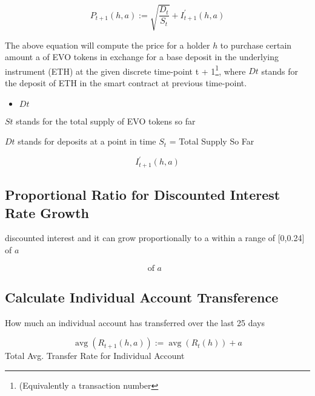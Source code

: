 \begin{tcolorbox}
\label{eq:Base Primitive Equation}


\begin{equation}
P_{t+1}(h, a):=\sqrt{\frac{D_{t}}{S_{t}}}+I_{t+1}^{\prime}(h, a)
\end{equation}

\end{tcolorbox}

The above equation will compute the price for a holder $h$ to purchase
certain amount a of EVO tokens in exchange for a base deposit in the underlying instrument (ETH) at the given discrete time-point {t + 1}\footnote{(Equivalently a transaction
number}, where $Dt$ stands for the deposit of ETH in the smart contract at previous time-point.

\begin{itemize}
    \item $Dt$
\end{itemize}


\label{total.supply.minted-evo}
$St$ stands for the total supply of EVO tokens so far

\label{deposits.discrete}
$Dt$  stands for deposits at a point in time 
\newline
\label{total.supply.so-far}
$S_t$ = Total Supply So Far

\begin{equation}
I_{t+1}^{\prime}(h, a)
\end{equation}

\newpage

\subsection{Proportional Ratio for Discounted Interest Rate Growth}
discounted interest and it can grow proportionally to a within
a range of [0,0.24] of $a$

\label{discounted.interest.range}
\begin{equation}
[0,0.24] \text{of $a$ }
\end{equation}

\subsection{Calculate Individual Account Transference}
How much an individual account has transferred over the last 25 days 

\label{total.individual.avg.transfer.rate}
\begin{equation}
\operatorname{avg}\left(R_{t+1}(h, a)\right):=\operatorname{avg}\left(R_{t}(h)\right)+a
\end{equation}
Total Avg. Transfer Rate for Individual Account
\newline



